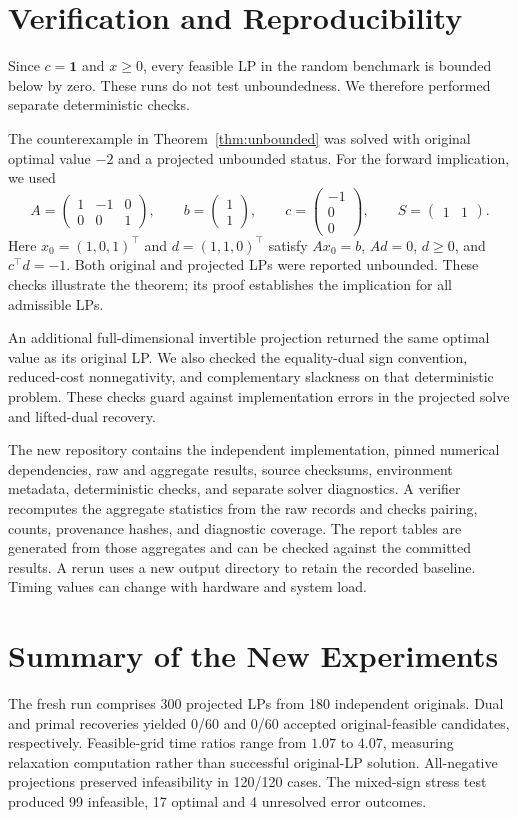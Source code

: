 \documentclass[12pt,letterpaper,oneside]{report}
\theoremstyle{definition}
\begin{document}
\section{Verification and Reproducibility}
Since $c=\mathbf{1}$ and $x\geq0$, every feasible LP in the random
benchmark is bounded below by zero. These runs do not test
unboundedness. We therefore performed separate deterministic checks.

The counterexample in Theorem~\ref{thm:unbounded} was solved with
original optimal value $-2$ and a projected unbounded status.
For the forward implication, we used
\[
A=\begin{pmatrix}1&-1&0\\0&0&1\end{pmatrix},\qquad
b=\begin{pmatrix}1\\1\end{pmatrix},\qquad
c=\begin{pmatrix}-1\\0\\0\end{pmatrix},\qquad
S=\begin{pmatrix}1&1\end{pmatrix}.
\]
Here $x_0=(1,0,1)^\top$ and $d=(1,1,0)^\top$ satisfy
$Ax_0=b$, $Ad=0$, $d\geq0$, and $c^\top d=-1$.
Both original and projected LPs were reported unbounded.
These checks illustrate the theorem; its proof establishes the
implication for all admissible LPs.

An additional full-dimensional invertible projection returned the same
optimal value as its original LP. We also checked the equality-dual sign
convention, reduced-cost nonnegativity, and complementary slackness on
that deterministic problem. These checks guard against implementation
errors in the projected solve and lifted-dual recovery.

The new repository contains the independent implementation, pinned
numerical dependencies, raw and aggregate results, source checksums,
environment metadata, deterministic checks, and separate solver
diagnostics. A verifier recomputes the aggregate statistics from the raw
records and checks pairing, counts, provenance hashes, and diagnostic
coverage. The report tables are generated from those aggregates and can
be checked against the committed results. A rerun uses a new output
directory to retain the recorded baseline. Timing values can change
with hardware and system load.

\section{Summary of the New Experiments}
The fresh run comprises 300 projected LPs from 180 independent originals. Dual and primal recoveries yielded 0/60 and 0/60 accepted original-feasible candidates, respectively. Feasible-grid time ratios range from $1.07$ to $4.07$, measuring relaxation computation rather than successful original-LP solution. All-negative projections preserved infeasibility in 120/120 cases. The mixed-sign stress test produced 99 infeasible, 17 optimal and 4 unresolved error outcomes.
\end{document}
